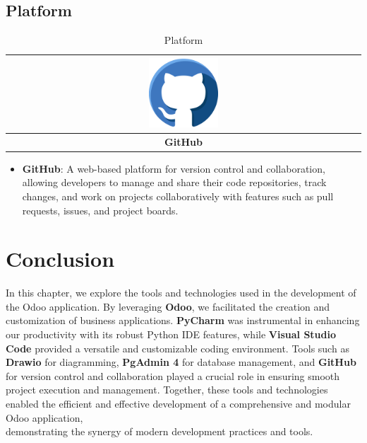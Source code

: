 \subsection{Platform}
\begin{table}[htbp]
    \centering
  
    \begin{tabular}{|c|}
        \hline
        \includegraphics[width=0.2\textwidth]{media/github.png} \\
        \hline
        \textbf{\cellcolor{gray!50}GitHub \cite{github}} \\
        \hline
    \end{tabular}
      \caption{Platform}
    \label{tab:Platform}
\end{table}
\begin{itemize}
    \item \textbf{GitHub}: A web-based platform for version control and collaboration, allowing developers to manage and share their code repositories, track changes, and work on projects collaboratively with features such as pull requests, issues, and project boards.
\end{itemize}



\section*{Conclusion}


In this chapter, we explore the tools and technologies used in the development of the Odoo application. By leveraging \textbf{Odoo}, we facilitated the creation and customization of business applications. \textbf{PyCharm} was instrumental in enhancing our productivity with its robust Python IDE features, while \textbf{Visual Studio Code} provided a versatile and customizable coding environment. Tools such as \textbf{Drawio} for diagramming, \textbf{PgAdmin 4} for database management, and \textbf{GitHub} for version control and collaboration played a crucial role in ensuring smooth project execution and management. Together, these tools and technologies enabled the efficient and effective development of a comprehensive and modular Odoo application, \\ demonstrating the synergy of modern development practices and tools.


